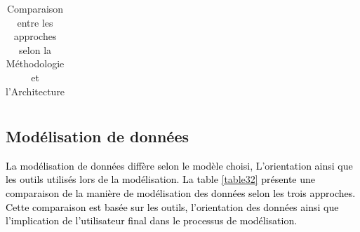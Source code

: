 \documentclass[a4paper,12pt]{report}
\begin{document}
\begin{table}[H]
\begin{adjustbox}{center}
\begin{tabular}{lll|l|l|l|}
		\end{tabular}
\end{adjustbox}
	\caption{Comparaison entre les approches selon la Méthodologie et l'Architecture}
	\label{table31}
\end{table}	

\subsection{Modélisation de données	}
\textcolor{black}{La modélisation de données  diffère selon le modèle choisi, L'orientation ainsi que les outils utilisés lors de la modélisation. La table \ref{table32} présente une comparaison de la manière de modélisation des données selon les trois approches. Cette comparaison est basée sur les outils, l'orientation des données ainsi que l'implication de l'utilisateur final dans le processus de modélisation.}
\end{document}
